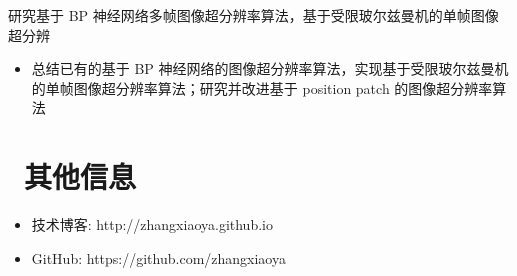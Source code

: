 \documentclass{resume}
\begin{document}
\begin{onehalfspacing}
研究基于 BP 神经网络多帧图像超分辨率算法，基于受限玻尔兹曼机的单帧图像超分辨
\begin{itemize}
  \item 总结已有的基于 BP 神经网络的图像超分辨率算法，实现基于受限玻尔兹曼机的单帧图像超分辨率算法；研究并改进基于 position patch 的图像超分辨率算法
\end{itemize}
\end{onehalfspacing}


\section{\faInfo\ 其他信息}
\begin{itemize}[parsep=0.5ex]
  \item 技术博客: http://zhangxiaoya.github.io
  \item GitHub: https://github.com/zhangxiaoya
\end{itemize}
\end{document}
